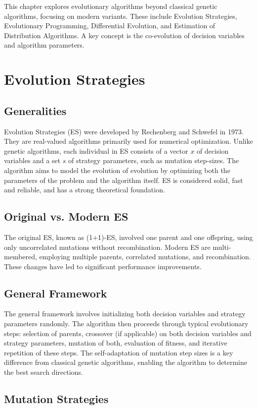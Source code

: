 This chapter explores evolutionary algorithms beyond classical genetic algorithms, focusing on modern variants. These include Evolution Strategies, Evolutionary Programming, Differential Evolution, and Estimation of Distribution Algorithms. A key concept is the co-evolution of decision variables and algorithm parameters.

\section{Evolution Strategies}
\subsection*{Generalities}
Evolution Strategies (ES) were developed by Rechenberg and Schwefel in 1973. They are real-valued algorithms primarily used for numerical optimization. Unlike genetic algorithms, each individual in ES consists of a vector $x$ of decision variables and a set $s$ of strategy parameters, such as mutation step-sizes. The algorithm aims to model the evolution of evolution by optimizing both the parameters of the problem and the algorithm itself. ES is considered solid, fast and reliable, and has a strong theoretical foundation.

\subsection*{Original vs. Modern ES}
The original ES, known as (1+1)-ES, involved one parent and one offspring, using only uncorrelated mutations without recombination. Modern ES are multi-membered, employing multiple parents, correlated mutations, and recombination. These changes have led to significant performance improvements.

\subsection*{General Framework}
The general framework involves initializing both decision variables and strategy parameters randomly. The algorithm then proceeds through typical evolutionary steps: selection of parents, crossover (if applicable) on both decision variables and strategy parameters, mutation of both, evaluation of fitness, and iterative repetition of these steps. The self-adaptation of mutation step sizes is a key difference from classical genetic algorithms, enabling the algorithm to determine the best search directions.

\subsection*{Mutation Strategies}
